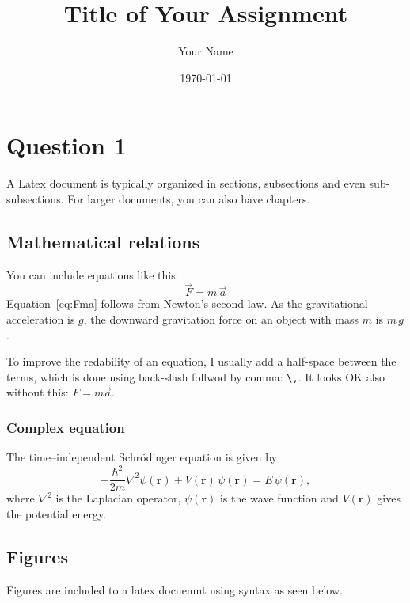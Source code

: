 \documentclass[12pt]{article}
\title{Title of Your Assignment}
\author{Your Name}
\date{\today}  %
\begin{document}
\maketitle

\section{Question 1}

A Latex document is typically organized in sections, subsections and even sub-subsections. For larger documents, you can also have chapters.

\subsection{Mathematical relations}
You can include equations like this:
\begin{equation}
  \vec{F} = m \,\vec{a} 
  \label{eq:Fma}
\end{equation}
Equation~\ref{eq:Fma} follows from Newton's second law. As the gravitational acceleration is $g$, the downward gravitation force on an object with mass $m$ is $m\,g$.

To improve the redability of an equation, I usually add a half-space between the terms, which is done using back-slash follwod by comma: \texttt{\textbackslash,}.
It looks OK also without this: $F=m\vec{a}$.

\subsubsection{Complex equation}

The time–independent Schr{\"o}dinger equation is given by
\begin{equation}
  -\frac{\hbar^2}{2m} \nabla^2 \psi(\mathbf{r}) + V(\mathbf{r}) \, \psi(\mathbf{r}) 
= E \, \psi(\mathbf{r}),
\label{eq:schrodinger}
\end{equation}
where $\nabla^2$ is the Laplacian operator, $\psi(\mathbf{r})$ is the wave function and $V(\mathbf{r})$ gives the potential energy.
\subsection{Figures}

Figures are included to a latex docuemnt using syntax as seen below.
\end{document}
